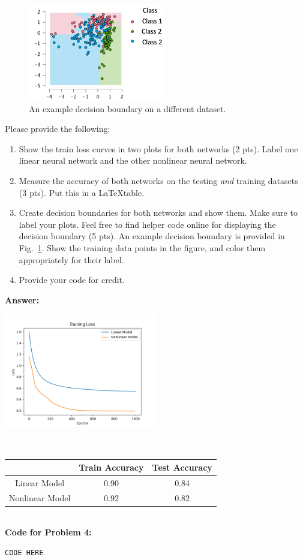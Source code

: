 \documentclass[11pt, oneside]{article}   	%
\begin{document}
\begin{figure}
    \centering
    \includegraphics{example.png}
    \caption{An example decision boundary on a different dataset.}
    \label{fig:example}
\end{figure}


Please provide the following:
\begin{enumerate}
    \item Show the train loss curves in two plots for both networks (2 pts). Label one linear neural network and the other nonlinear neural network.
    \item Measure the accuracy of both networks on the testing \emph{and} training datasets (3 pts). Put this in a \LaTeX table.
    \item Create decision boundaries for both networks and show them. Make sure to label your plots. Feel free to find helper code online for displaying the decision boundary (5 pts). An example decision boundary is provided in Fig.~\ref{fig:example}. Show the training data points in the figure, and color them appropriately for their label.
    \item Provide your code for credit.
\end{enumerate}

\newpage

\textbf{Answer:} \\
\begin{center}
    \includegraphics[width=0.5\textwidth]{Trainloss.png}
\end{center}
\\
\begin{center}
    \begin{tabular}{|c|c|c|}
        \hline
        & Train Accuracy & Test Accuracy \\ \hline
        Linear Model & 0.90 & 0.84 \\ \hline
        Nonlinear Model & 0.92 & 0.82 \\ \hline
    \end{tabular}
\end{center}
\\




\textbf{Code for Problem 4:} \\
\begin{verbatim}
CODE HERE
\end{verbatim}
\end{document}
